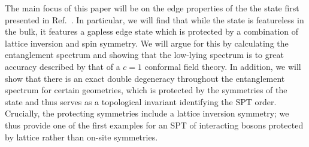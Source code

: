 
The main focus of this paper will be on the edge properties of the the state
first presented in Ref.~.
In particular, we will find that while the state is featureless in the bulk, it
features a gapless edge state which is protected by a combination of lattice 
inversion and spin symmetry. We will argue for this by calculating the entanglement 
spectrum and showing that the low-lying spectrum is to great accuracy described by that of a $c=1$
conformal field theory.
In addition, we will show that there is an exact double 
degeneracy throughout the entanglement spectrum for certain geometries, which is protected
by the symmetries of the state and thus serves as a topological invariant identifying the SPT order.
Crucially, the protecting symmetries include a lattice inversion symmetry; we thus provide
one of the first examples for an SPT of interacting bosons protected by lattice rather than on-site
symmetries.


